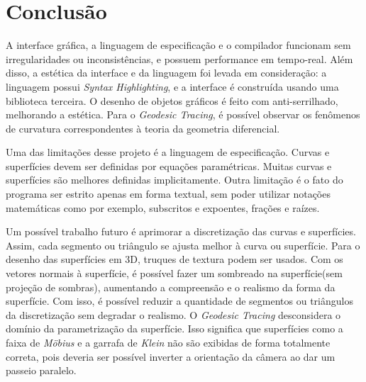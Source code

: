 \chapter{Conclusão}

A interface gráfica, a linguagem de especificação e o compilador
funcionam sem irregularidades ou inconsistências, e possuem performance em tempo-real.
Além disso, a estética da interface e da linguagem foi levada em consideração:
a linguagem possui \textit{Syntax Highlighting}, e a interface é construída usando uma biblioteca
terceira. O desenho de objetos gráficos é feito com anti-serrilhado, melhorando a estética.
Para o \textit{Geodesic Tracing}, é possível observar os fenômenos de curvatura
correspondentes à teoria da geometria diferencial.

Uma das limitações desse projeto é a linguagem de especificação.
Curvas e superfícies devem ser definidas por equações paramétricas.
Muitas curvas e superfícies são melhores definidas implicitamente.
Outra limitação é o fato do programa ser estrito apenas em forma textual, sem poder utilizar
notações matemáticas como por exemplo, subscritos e expoentes, frações e raízes.

Um possível trabalho futuro é aprimorar a discretização das curvas e superfícies.
Assim, cada segmento ou triângulo se ajusta melhor à curva ou superfície.
Para o desenho das superfícies em 3D, truques de textura podem ser usados.
Com os vetores normais à superfície, é possível fazer um sombreado na superfície(sem projeção de sombras),
aumentando a compreensão e o realismo da forma da superfície.
Com isso, é possível reduzir a quantidade de segmentos ou triângulos da discretização
sem degradar o realismo.
O \textit{Geodesic Tracing} desconsidera o domínio da parametrização da superfície.
Isso significa que superfícies como a faixa de \textit{M\"obius} e a garrafa de \textit{Klein}
não são exibidas de forma totalmente correta, pois deveria ser possível inverter a orientação da câmera
ao dar um passeio paralelo.